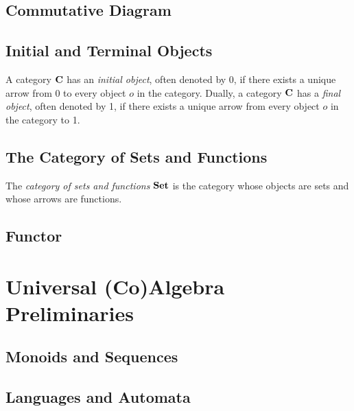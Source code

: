 \subsection{Commutative Diagram}

\subsection{Initial and Terminal Objects}
A category $\AsCategory{C}$ has an \emph{initial object}, often denoted by 0, if there exists a unique arrow from $0$ to every object $o$ in the category. Dually, a category $\AsCategory{C}$ has a \emph{final object}, often denoted by 1, if there exists a unique arrow from every object $o$ in the category to 1. 

\subsection{The Category of Sets and Functions}
The \emph{category of sets and functions} $\AsCategory{Set}$ is the category whose objects are sets and whose arrows are functions. 

\subsection{Functor}

\section{Universal (Co)Algebra Preliminaries}
\label{sec:Preliminaries:Coalgebras}
\subsection{Monoids and Sequences}
\subsection{Languages and Automata}
